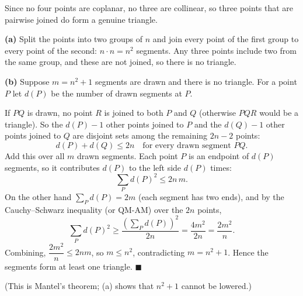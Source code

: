 Since no four points are coplanar, no three are collinear, so three points that are pairwise joined do form a genuine triangle.

\textbf{(a)} Split the points into two groups of $n$ and join every point of the first group to every point of the second: $n\cdot n=n^2$ segments. Any three points include two from the same group, and these are not joined, so there is no triangle.

\textbf{(b)} Suppose $m=n^2+1$ segments are drawn and there is no triangle. For a point $P$ let $d(P)$ be the number of drawn segments at $P$.

If $PQ$ is drawn, no point $R$ is joined to both $P$ and $Q$ (otherwise $PQR$ would be a triangle). So the $d(P)-1$ other points joined to $P$ and the $d(Q)-1$ other points joined to $Q$ are disjoint sets among the remaining $2n-2$ points:
\[d(P)+d(Q)\le2n\quad\text{for every drawn segment }PQ.\]
Add this over all $m$ drawn segments. Each point $P$ is an endpoint of $d(P)$ segments, so it contributes $d(P)$ to the left side $d(P)$ times:
\[\sum_{P}d(P)^2\le2n\,m.\]
On the other hand $\sum_Pd(P)=2m$ (each segment has two ends), and by the Cauchy--Schwarz inequality (or QM-AM) over the $2n$ points,
\[\sum_Pd(P)^2\ge\dfrac{\left(\sum_Pd(P)\right)^2}{2n}=\dfrac{4m^2}{2n}=\dfrac{2m^2}{n}.\]
Combining, $\dfrac{2m^2}{n}\le2nm$, so $m\le n^2$, contradicting $m=n^2+1$. Hence the segments form at least one triangle. $\blacksquare$

(This is Mantel's theorem; (a) shows that $n^2+1$ cannot be lowered.)
